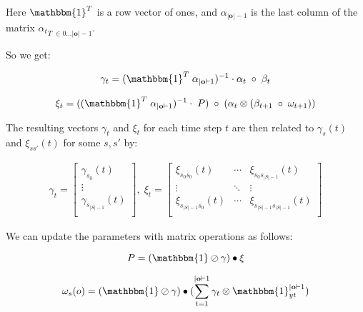 Here $\mathbbm{1}^T$ is a row vector of ones, and $\alpha_{|\mathbf{o}|-1}$ is the last column of the matrix ${\alpha_t}_{T \;\in 0\dots|\mathbf{o}|-1}$.

So we get:

\begin{equation}
    {\gamma}_t = (\mathbbm{1}^T \; \alpha_{|\mathbf{o}|-1})^{-1} \cdot \alpha_t \; \circ \; \beta_t
    \label{eq:gamma-matrix-ones}
\end{equation}

\begin{equation}
    {\xi}_t = ((\mathbbm{1}^T \; \alpha_{|\mathbf{o}|-1})^{-1} \cdot \; {P}) \; \circ \;(\alpha_t \otimes (\beta_{t+1} \; \circ \; {\omega}_{t+1}))
    \label{eq:xi-matrix-ones}
\end{equation}

The resulting vectors ${\gamma}_t$ and ${\xi}_t$ for each time step $t$ are then related to $\gamma_s(t)$ and $\xi_{ss'}(t)$ for some $s, s'$ by:

\begin{align}
    {\gamma}_t = \begin{bmatrix}
        \gamma_{s_0}(t)       \\
        \vdots                \\
        \gamma_{s_{|S|-1}}(t) \\
    \end{bmatrix}, \;
    {\xi}_t = \begin{bmatrix}
        \xi_{s_0 s_0}(t)      & \cdots & \xi_{s_0 s_{|S|-1}}(t)      \\
        \vdots                & \ddots & \vdots                      \\
        \xi_{s_{|S|-1}s_0}(t) & \cdots & \xi_{s_{|S|-1}s_{|S|-1}}(t) \\
    \end{bmatrix}
\end{align}

We can update the parameters with matrix operations as follows:

\begin{equation}
    {P} = (\mathbbm{1} \oslash \gamma) \bullet \xi
    \label{eq:transition-probabilities-update}
\end{equation}

\begin{equation}
    {\omega}_s(o) = (\mathbbm{1} \oslash \gamma) \bullet (\sum_{t=1}^{|\mathbf{o}|-1} \gamma_t \otimes \mathbbm{1}_{yt}^{|\mathbf{o}|-1})
    \label{eq:omega-update}
\end{equation}

